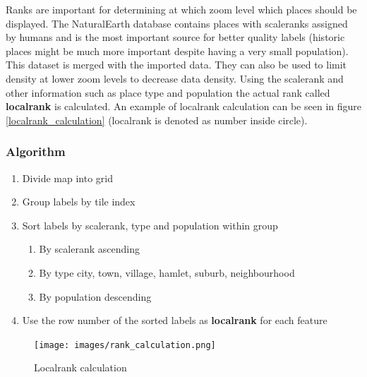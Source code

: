 Ranks are important for determining at which zoom level which places should be displayed. The NaturalEarth database contains places with scaleranks assigned by humans and is the most important source for better quality labels (historic places might be much more important despite having a very small population). This dataset is merged with the imported \osm{} data.
They can also be used to limit density at lower zoom levels to decrease data density. Using the scalerank and other information such as place type and population the actual rank called \textbf{localrank} is calculated. An example of localrank calculation can be seen in figure \autoref{localrank_calculation} (localrank is denoted as number inside circle).

\subsubsection*{Algorithm}

\noindent\begin{minipage}[t]{0.48\linewidth}
    \vspace{0pt}
    \begin{enumerate}  
        \item Divide map into grid
        \item Group labels by tile index
        \item Sort labels by scalerank, type and population within group
        \begin{enumerate}
            \item By scalerank ascending
            \item By type city, town, village, hamlet, suburb, neighbourhood
            \item By population descending
        \end{enumerate}
        \item Use the row number of the sorted labels as \textbf{localrank} for each feature
    \end{enumerate}
\end{minipage}
\hfill
\begin{minipage}[t]{0.48\linewidth}
    \vspace{-10pt}
    \begin{figure}[H]
    \centering
    \texttt{[image: images/rank\_calculation.png]}
    \caption{Localrank calculation}
    \label{localrank_calculation}
    \end{figure}
\end{minipage}